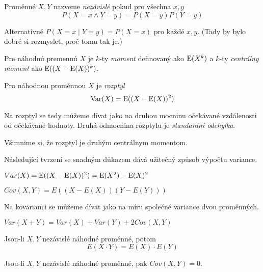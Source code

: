 \begin{definition}
    Proměnné $X,Y$ nazveme {\em nezávislé} pokud pro všechna $x,y$
    \[
        P(X = x \land Y = y) = P(X = y) P(Y = y)
    \]
\end{definition}

Alternativně $P(X = x \mid Y = y) = P(X = x)$ pro každé $x,y$. (Tady by
bylo dobré si rozmyslet, proč tomu tak je.)

\begin{definition}[Momenty]
    Pre náhodnú premennú $X$ je $k$-ty {\em moment}
	definovaný ako $\operatorname{E}(X^k)$ a $k$-ty {\em centrálny moment}
	ako $\operatorname{E}((X-\operatorname{E}(X))^k)$.
\end{definition}

\begin{definition}
    Pro náhodnou proměnnou $X$ je {\em rozptyl}
    \[ \operatorname{Var}(X) = \operatorname{E}( (X - \operatorname{E}(X))^2 ) \]
\end{definition}

Na rozptyl se tedy můžeme dívat jako na druhou mocninu očekávané
vzdálenosti od očekávané hodnoty. Druhá odmocnina rozptylu je
{\em standardní odchylka}.

Všimnime si, že rozptyl je druhým centrálnym momentom.

Následující tvrzení se snadným důkazem dává užitečný způsob výpočtu
variance.

\begin{claim}
    $ Var(X) = \operatorname{E}( (X - \operatorname{E}(X))^2 ) = \operatorname{E}(X^2) - \operatorname{E}(X)^2 $
\end{claim}

\begin{definition}[Kovariance]
    $ Cov(X,Y) = E((X - E(X))(Y - E(Y))) $
\end{definition}

Na kovarianci se můžeme dívat jako na míru společné variance dvou
proměnných.

\begin{claim}
    $Var(X + Y) = Var(X) + Var(Y) + 2 Cov(X,Y)$
\end{claim}

\begin{theorem}
    Jsou-li $X, Y$ nezávislé náhodné proměnné, potom
    \[ E(X \cdot Y) = E(X) \cdot E(Y) \]
\end{theorem}


\begin{corollary}
    Jsou-li $X, Y$ nezávislé náhodné proměnné, pak $Cov(X,Y) = 0$.
\end{corollary}

